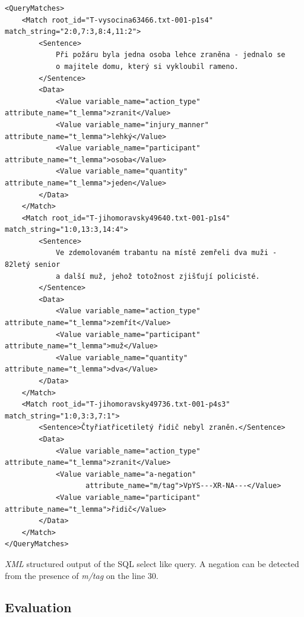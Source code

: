 \begin{listing}[ht]
\begin{verbatim}
<QueryMatches>
	<Match root_id="T-vysocina63466.txt-001-p1s4" match_string="2:0,7:3,8:4,11:2">
		<Sentence>
			Při požáru byla jedna osoba lehce zraněna - jednalo se
			o majitele domu, který si vykloubil rameno.
		</Sentence>
		<Data>
			<Value variable_name="action_type" attribute_name="t_lemma">zranit</Value>
			<Value variable_name="injury_manner" attribute_name="t_lemma">lehký</Value>
			<Value variable_name="participant" attribute_name="t_lemma">osoba</Value>
			<Value variable_name="quantity" attribute_name="t_lemma">jeden</Value>
		</Data>
	</Match>
	<Match root_id="T-jihomoravsky49640.txt-001-p1s4" match_string="1:0,13:3,14:4">
		<Sentence>
			Ve zdemolovaném trabantu na místě zemřeli dva muži - 82letý senior
			a další muž, jehož totožnost zjišťují policisté.
		</Sentence>
		<Data>
			<Value variable_name="action_type" attribute_name="t_lemma">zemřít</Value>
			<Value variable_name="participant" attribute_name="t_lemma">muž</Value>
			<Value variable_name="quantity" attribute_name="t_lemma">dva</Value>
		</Data>
	</Match>
	<Match root_id="T-jihomoravsky49736.txt-001-p4s3" match_string="1:0,3:3,7:1">
		<Sentence>Čtyřiatřicetiletý řidič nebyl zraněn.</Sentence>
		<Data>
			<Value variable_name="action_type" attribute_name="t_lemma">zranit</Value>
			<Value variable_name="a-negation" 
			       attribute_name="m/tag">VpYS---XR-NA---</Value>
			<Value variable_name="participant" attribute_name="t_lemma">řidič</Value>
		</Data>
	</Match>
</QueryMatches>
\end{verbatim}
\caption{\emph{XML} structured output of the SQL select like query. A negation can be detected from the presence of \emph{m/tag} on the line 30.}
\label{lst:select_xml}
\end{listing}


\clearpage

\subsection{Evaluation}



